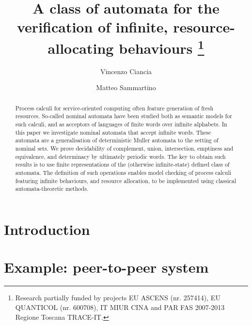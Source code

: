 \documentclass[orivec]{llncs}
\title{A class of automata for the verification of infinite, resource-allocating behaviours%
 \thanks{Research partially funded by projects EU 
 ASCENS (nr. 257414), EU QUANTICOL (nr. 600708), 
 IT MIUR CINA and PAR FAS 2007-2013 Regione Toscana TRACE-IT.}
}
\author{Vincenzo Ciancia\inst{1} \and Matteo Sammartino\inst{2}}
\institute{ISTI-CNR, Pisa \and Dipartimento di Informatica, Universit\`a di Pisa, Pisa }
\begin{document}
\maketitle

\begin{abstract}
Process calculi for service-oriented computing often feature generation of fresh resources. So-called nominal automata have been studied both as semantic models for such calculi, and as acceptors of languages of finite words over infinite alphabets. In this paper we investigate nominal automata that accept infinite words. These automata are a generalisation of deterministic Muller automata to the setting of nominal sets. We prove decidability of complement, union, intersection, emptiness and equivalence, and determinacy by ultimately periodic words. The key to obtain such results is to use finite representations of the (otherwise infinite-state) defined class of automata. The definition of such operations enables model checking of process calculi featuring infinite behaviours, and resource allocation, to be implemented using classical automata-theoretic methods.
% 
\end{abstract}

\section{Introduction}\label{sec:introduction}

\section{Example: peer-to-peer system}\label{sec:example}

\end{document}
